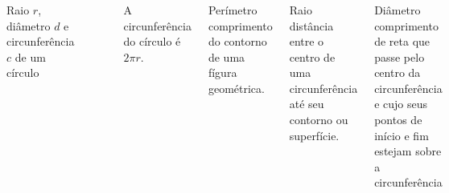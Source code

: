 \documentclass[handout]{beamer}
\begin{document}

\begin{frame}\frametitle{\subsecname}
    \begin{columns}
        \begin{figure}[H]
            \centering
            \caption{Raio $r$, diâmetro $d$ e circunferência $c$ de um círculo}
        \end{figure}

        A circunferência do círculo é $2\pi r$.

        \begin{block}{Perímetro}
            comprimento do contorno de uma fígura geométrica. \\
        \end{block}

        \begin{block}{Raio}
            distância entre o centro de uma circunferência até seu contorno ou superfície.
        \end{block}

        \begin{block}{Diâmetro}
            comprimento de reta que passe pelo centro da circunferência e cujo seus pontos de início e fim estejam sobre a circunferência
        \end{block}


    \end{columns}

\end{frame}

\end{document}
